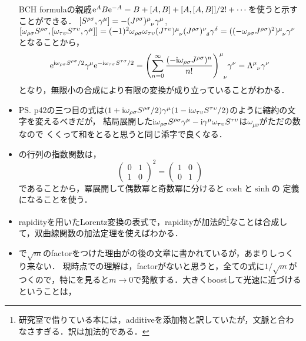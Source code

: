 \begin{itemize}
		BCH formulaの親戚$\mathrm{e}^{A}B\mathrm{e}^{-A} = B + [A, B] + [A, [A, B]]/2!  + \cdots$を使うと示すことができる．
		$[S^{\rho\sigma}, \gamma^{\mu}] = -(J^{\rho\sigma})\indices{^\mu_\nu}\gamma^{\mu}$, 
		$[\omega_{\rho\sigma}S^{\rho\sigma},[\omega_{\tau\upsilon}S^{\tau\upsilon}, \gamma^{\mu}]] \allowbreak = (-1)^2\omega_{\rho\sigma}\omega_{\tau\upsilon}(J^{\tau\upsilon})\indices{^\mu_\nu}(J^{\rho\sigma})\indices{^\nu_\delta}\gamma^{\delta} = ((-\omega_{\rho\sigma}J^{\rho\sigma})^2)\indices{^\mu_\nu}\gamma^{\nu}$
		となることから，
		\begin{equation}
			\e^{\i\omega_{\rho\sigma}S^{\rho\sigma}/2}\gamma^{\mu}\e^{-\i\omega_{\tau\sigma}S^{\tau\sigma}/2} = \qty(\sum_{n=0}^{\infty}\frac{(-\i\omega_{\rho\sigma }J^{\rho\sigma})^n}{n!})\indices{^\mu_\nu}\gamma^{\nu}
			= \Lambda\indices{^\mu_\nu}\gamma^{\nu}
		\end{equation}
		となり，無限小の合成により有限の変換が成り立っていることがわかる．
	\item PS. p42の三つ目の式は$(1+\mathrm{i}\omega_{\rho\sigma}S^{\rho\sigma}/2)\gamma^{\mu}(1-\mathrm{i}\omega_{\tau\upsilon}S^{\tau\upsilon}/2)$のように縮約の文字を変えるべきだが，
	結局展開した$\mathrm{i}\omega_{\rho\sigma}S^{\rho\sigma}\gamma^{\mu}-\mathrm{i}\gamma^{\mu}\omega_{\tau\upsilon}S^{\tau\upsilon}$は$\omega_{\mu\nu}$がただの数なので
	くくって和をとると思うと同じ添字で良くなる．
	\item {}の行列の指数関数は，
		\begin{equation}
			\begin{pmatrix}
				0 & 1\\
				1 & 0
			\end{pmatrix}^2 = 
			\begin{pmatrix}
				1 & 0\\
				0 &1
			\end{pmatrix}
		\end{equation}
		であることから，冪展開して偶数冪と奇数冪に分けると$\cosh$と$\sinh$の
		定義になることを使う．
	\item rapidityを用いたLorentz変換の表式で，rapidityが加法的\footnote{研究室で借りている本には，additiveを添加物と訳していたが，文脈と合わなさすぎる．訳は加法的である．}なことは合成して，双曲線関数の加法定理を使えばわかる．
	\item {}で$\sqrt{m}$のfactorをつけた理由がの後の文章に書かれているが，あまりしっくり来ない．
		現時点での理解は，factorがないと思うと，全ての式に$1/\sqrt{m}$がつくので，特にを見ると$m\to0$で発散する．大きくboostして光速に近づけるということは，

\end{itemize}
